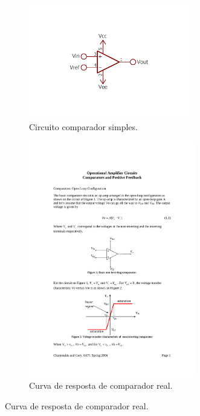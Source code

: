 	\begin{figure}[htb]
		\caption{\label{fig_double_comparator}Comparador e curva de resposta.}
		\begin{subfigure}{.5\textwidth}
			\caption{\label{fig_comparator_circuit}Circuito comparador simples.}
			\centering
			\includegraphics[width=0.77\textwidth, trim={7.5cm 5cm 7.5cm 5.5cm},clip]{circuits/comparator_amp.pdf}
		\end{subfigure}
		\begin{subfigure}{.5\textwidth}
			\caption{\label{fig_comparator_transfer}Curva de resposta de comparador real.}
			\centering
			\includegraphics[page=1,width=0.8\textwidth, trim={6.9cm 5.5cm 6.9cm 19.25cm},clip]{circuits/lecture_comparator.pdf}
		\end{subfigure}
	\end{figure}
	
